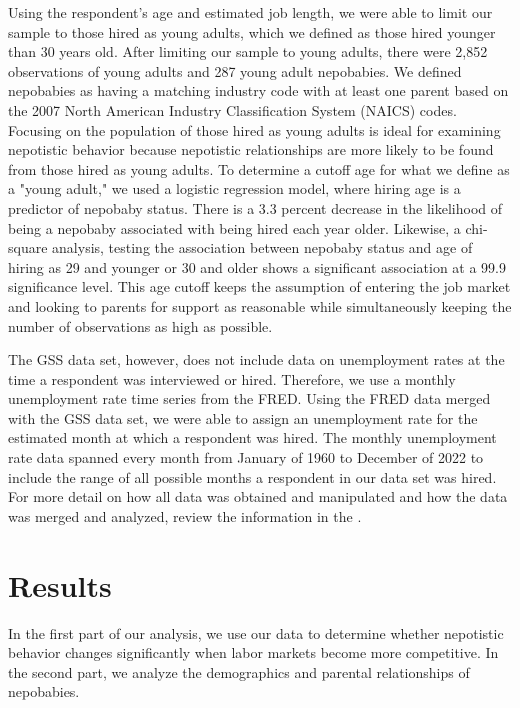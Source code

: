 \documentclass[12pt]{article}
\begin{document}
Using the respondent’s age and estimated job length, we were able to limit our sample to those hired as young adults, which we defined as those hired younger than 30 years old. After limiting our sample to young adults, there were 2,852  observations of young adults and 287 young adult nepobabies. We defined nepobabies as having a matching industry code with at least one parent based on the 2007 North American Industry Classification System (NAICS) codes. Focusing on the population of those hired as young adults is ideal for examining nepotistic behavior because nepotistic relationships are more likely to be found from those hired as young adults. To determine a cutoff age for what we define as a "young adult," we used a logistic regression model, where hiring age is a predictor of nepobaby status. There is a 3.3 percent decrease in the likelihood of being a nepobaby associated with being hired each year older. Likewise, a chi-square analysis, testing the association between nepobaby status and age of hiring as 29 and younger or 30 and older shows a significant association at a 99.9 significance level. This age cutoff keeps the assumption of entering the job market and looking to parents for support as reasonable while simultaneously keeping the number of observations as high as possible.

The GSS data set, however, does not include data on unemployment rates at the time a respondent was interviewed or hired. Therefore, we use a monthly unemployment rate time series from the FRED. Using the FRED data merged with the GSS data set, we were able to assign an unemployment rate for the estimated month at which a respondent was hired. The monthly unemployment rate data spanned every month from January of 1960 to December of 2022 to include the range of all possible months a respondent in our data set was hired. For more detail on how all data was obtained and manipulated and how the data was merged and analyzed, review the information in the .


\section{Results}
\label{sec:result}

In the first part of our analysis, we use our data to determine whether nepotistic behavior changes significantly when labor markets become more competitive. In the second part, we analyze the demographics and parental relationships of nepobabies.
\end{document}
